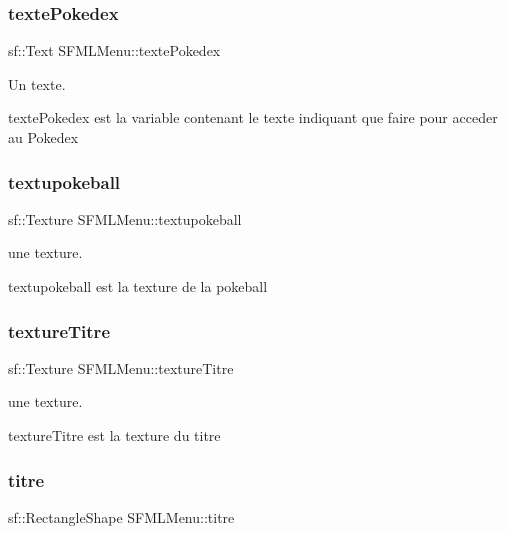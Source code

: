 \subsubsection{\texorpdfstring{texte\+Pokedex}{textePokedex}}
{\footnotesize\ttfamily sf\+::\+Text S\+F\+M\+L\+Menu\+::texte\+Pokedex\hspace{0.3cm}{\ttfamily [private]}}



Un texte. 

texte\+Pokedex est la variable contenant le texte indiquant que faire pour acceder au Pokedex \mbox{\label{class_s_f_m_l_menu_a6147373e00b8118205fbcb7d8d6fd3bc}} 
\subsubsection{\texorpdfstring{textupokeball}{textupokeball}}
{\footnotesize\ttfamily sf\+::\+Texture S\+F\+M\+L\+Menu\+::textupokeball\hspace{0.3cm}{\ttfamily [private]}}



une texture. 

textupokeball est la texture de la pokeball \mbox{\label{class_s_f_m_l_menu_ace19b3f13ad15b2691d0250a469e05cc}} 
\subsubsection{\texorpdfstring{texture\+Titre}{textureTitre}}
{\footnotesize\ttfamily sf\+::\+Texture S\+F\+M\+L\+Menu\+::texture\+Titre\hspace{0.3cm}{\ttfamily [private]}}



une texture. 

texture\+Titre est la texture du titre \mbox{\label{class_s_f_m_l_menu_a23bd1d0304fdd666825a562609ef6fb5}} 
\subsubsection{\texorpdfstring{titre}{titre}}
{\footnotesize\ttfamily sf\+::\+Rectangle\+Shape S\+F\+M\+L\+Menu\+::titre\hspace{0.3cm}{\ttfamily [private]}}



